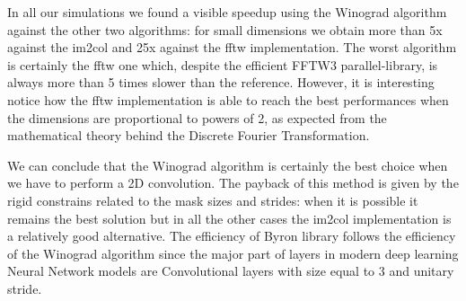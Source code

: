 \documentclass{standalone}
\begin{document}
In all our simulations we found a visible speedup using the \textsf{Winograd} algorithm against the other two algorithms: for small dimensions we obtain more than 5x against the \textsf{im2col} and 25x against the \textsf{fftw} implementation.
The worst algorithm is certainly the \textsf{fftw} one which, despite the efficient FFTW3 parallel-library, is always more than 5 times slower than the reference.
However, it is interesting notice how the \textsf{fftw} implementation is able to reach the best performances when the dimensions are proportional to powers of 2, as expected from the mathematical theory behind the Discrete Fourier Transformation.

We can conclude that the \textsf{Winograd} algorithm is certainly the best choice when we have to perform a 2D convolution.
The payback of this method is given by the rigid constrains related to the mask sizes and strides: when it is possible it remains the best solution but in all the other cases the \textsf{im2col} implementation is a relatively good alternative.
The efficiency of Byron library follows the efficiency of the \textsf{Winograd} algorithm since the major part of layers in modern deep learning Neural Network models are Convolutional layers with size equal to 3 and unitary stride.

\end{document}
